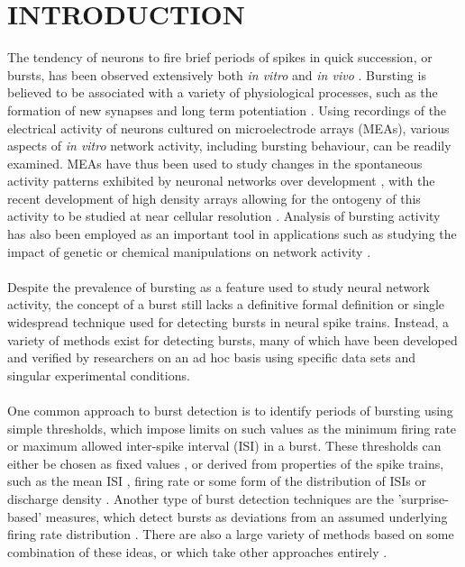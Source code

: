 \documentclass[12pt, titlepage]{article}
\begin{document}
	\section*{INTRODUCTION}
	The tendency of neurons to fire brief periods of spikes in quick succession, or bursts, has been observed extensively both \textit{in vitro} and \textit{in vivo} \cite{Weyand2001,Charlesworth2015,Pasquale2010}. Bursting is believed to be associated with a variety of physiological processes, such as the formation of new synapses \cite{Maeda1995} and long term potentiation \cite{Lisman1997}. Using recordings of the electrical activity of neurons cultured on microelectrode arrays (MEAs), various aspects of \textit{in vitro} network activity, including bursting behaviour, can be readily examined. MEAs have thus been used to study changes in the spontaneous activity patterns exhibited by neuronal networks over development \cite{Wagenaar2006,Charlesworth2015}, with the recent development of high density arrays allowing for the ontogeny of this activity to be studied at near cellular resolution \cite{Maccione2014}. Analysis of bursting activity has also been employed as an important tool in applications such as studying the impact of genetic or chemical manipulations on network activity \cite{Eisenman2015,Charlesworth2016}. 
	\\ \\ Despite the prevalence of bursting as a feature used to study neural network activity, the concept of a burst still lacks a definitive formal definition \cite{Cocatre-Zilgien1992} or single widespread technique used for detecting bursts in neural spike trains. Instead, a variety of methods exist for detecting bursts, many of which have been developed and verified by researchers on an ad hoc basis using specific data sets and singular experimental conditions. 
	\\\\One common approach to burst detection is to identify periods of bursting using simple thresholds, which impose limits on such values as the minimum firing rate or maximum allowed inter-spike interval (ISI) in a burst. These thresholds can either be chosen as fixed values  \cite{Cocatre-Zilgien1992,Chiappalone2005,Mukai2003},  or derived from properties of the spike trains, such as the mean ISI \cite{Chen2009}, firing rate \cite{Pimashkin2011} or some form of the distribution of ISIs or discharge density \cite{Selinger2007,Pasquale2010,Kaneoke1996,Bakkum2013,Kapucu2012}. Another type of burst detection techniques are the 'surprise-based' measures, which detect bursts as deviations from an assumed underlying firing rate distribution \cite{Legendy1985,Ko2012,Gourevitch2007}. There are also a large variety of methods based on some combination of these ideas, or which take other approaches entirely \cite{Hennig2011,Tokdar2010,Turnbull2005,Tam2002,Xia2003,Wagenaar2005,Weihberger2013}.
\end{document}

